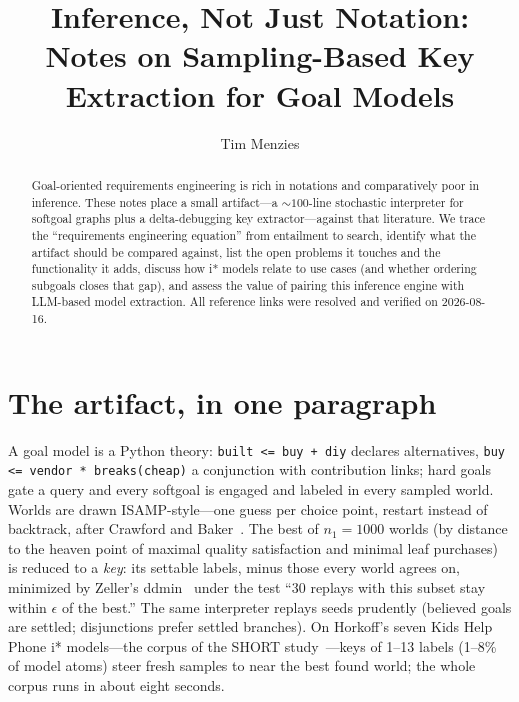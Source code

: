 \documentclass[sigconf,nonacm]{acmart}
\begin{document}
\title{Inference, Not Just Notation:\\ Notes on Sampling-Based
  Key Extraction for Goal Models}

\author{Tim Menzies}
\affiliation{\institution{}\city{}\country{}}

\begin{abstract}
Goal-oriented requirements engineering is rich in notations and
comparatively poor in inference. These notes place a small
artifact---a ${\sim}100$-line stochastic interpreter for
softgoal graphs plus a delta-debugging key extractor---against
that literature. We trace the ``requirements engineering
equation'' from entailment to search, identify what the
artifact should be compared against, list the open problems it
touches and the functionality it adds, discuss how i* models
relate to use cases (and whether ordering subgoals closes that
gap), and assess the value of pairing this inference engine
with LLM-based model extraction. All reference links were
resolved and verified on 2026-08-16.
\end{abstract}

\maketitle

\section{The artifact, in one paragraph}

A goal model is a Python theory: \verb|built <= buy + diy|
declares alternatives, \verb|buy <= vendor * breaks(cheap)|
a conjunction with contribution links; hard goals gate a query
and every softgoal is engaged and labeled in every sampled
world. Worlds are drawn ISAMP-style---one guess per choice
point, restart instead of backtrack, after Crawford and
Baker~\cite{crawford94}. The best of $n_1{=}1000$ worlds (by
distance to the heaven point of maximal quality satisfaction
and minimal leaf purchases) is reduced to a \emph{key}: its
settable labels, minus those every world agrees on, minimized
by Zeller's ddmin~\cite{zeller02} under the test ``30 replays
with this subset stay within $\epsilon$ of the best.'' The
same interpreter replays seeds prudently (believed goals are
settled; disjunctions prefer settled branches). On Horkoff's
seven Kids Help Phone i* models---the corpus of the SHORT
study~\cite{mathew17}---keys of 1--13 labels (1--8\% of model
atoms) steer fresh samples to near the best found world; the
whole corpus runs in about eight seconds.
\end{document}

